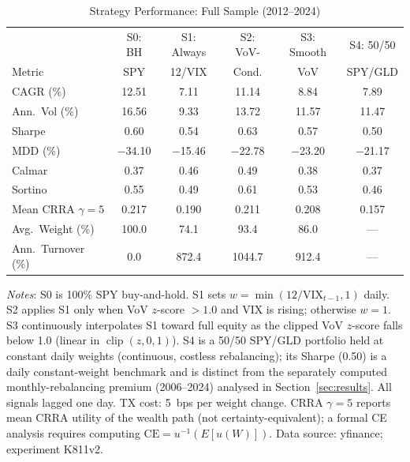 \documentclass[12pt,a4paper]{article}
\begin{document}
\begin{table}[H]
\centering
\begin{threeparttable}
\caption{Strategy Performance: Full Sample (2012--2024)}
\label{tab:performance}
\begin{tabular}{lccccc}
\toprule
 & S0: BH & S1: Always & S2: VoV- & S3: Smooth & S4: 50/50 \\
Metric & SPY & 12/VIX & Cond. & VoV & SPY/GLD \\
\midrule
CAGR (\%) & 12.51 & 7.11 & 11.14 & 8.84 & 7.89 \\
Ann.\ Vol (\%) & 16.56 & 9.33 & 13.72 & 11.57 & 11.47 \\
Sharpe & 0.60 & 0.54 & 0.63 & 0.57 & 0.50 \\
MDD (\%) & $-$34.10 & $-$15.46 & $-$22.78 & $-$23.20 & $-$21.17 \\
Calmar & 0.37 & 0.46 & 0.49 & 0.38 & 0.37 \\
Sortino & 0.55 & 0.49 & 0.61 & 0.53 & 0.46 \\
Mean CRRA $\gamma\!=\!5$ & 0.217 & 0.190 & 0.211 & 0.208 & 0.157 \\
\midrule
Avg.\ Weight (\%) & 100.0 & 74.1 & 93.4 & 86.0 & --- \\
Ann.\ Turnover (\%) & 0.0 & 872.4 & 1044.7 & 912.4 & --- \\
\bottomrule
\end{tabular}
\begin{tablenotes}
\small
\item \textit{Notes}: S0 is 100\% SPY buy-and-hold. S1 sets $w = \min(12/\text{VIX}_{t-1}, 1)$ daily. S2 applies S1 only when VoV $z$-score $> 1.0$ and VIX is rising; otherwise $w = 1$. S3 continuously interpolates S1 toward full equity as the clipped VoV $z$-score falls below 1.0 (linear in $\operatorname{clip}(z,0,1)$). S4 is a 50/50 SPY/GLD portfolio held at constant daily weights (continuous, costless rebalancing); its Sharpe (0.50) is a daily constant-weight benchmark and is distinct from the separately computed monthly-rebalancing premium (2006--2024) analysed in Section~\ref{sec:results}. All signals lagged one day. TX cost: 5~bps per weight change. CRRA $\gamma\!=\!5$ reports mean CRRA utility of the wealth path (not certainty-equivalent); a formal CE analysis requires computing $\text{CE} = u^{-1}(E[u(W)])$. Data source: yfinance; experiment K811v2.
\end{tablenotes}
\end{threeparttable}
\end{table}
\end{document}
